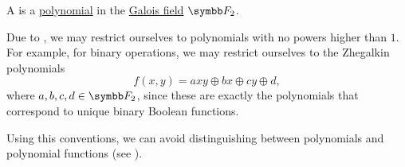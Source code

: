 \begin{definition}\label{def:zhegalkin_polynomial}
  A  is a \hyperref[def:polynomial]{polynomial} in the \hyperref[thm:galois_field_existence]{Galois field} \( \BF_2 \).

  Due to , we may restrict ourselves to polynomials with no powers higher than \( 1 \). For example, for binary operations, we may restrict ourselves to the Zhegalkin polynomials
  \begin{equation}\label{eq:def:zhegalkin_polynomial/binary_polynomial}
    f(x, y) = axy \oplus bx \oplus cy \oplus d,
  \end{equation}
  where \( a, b, c, d \in \BF_2 \), since these are exactly the polynomials that correspond to unique binary Boolean functions.

  Using this conventions, we can avoid distinguishing between polynomials and polynomial functions (see ).
\end{definition}

